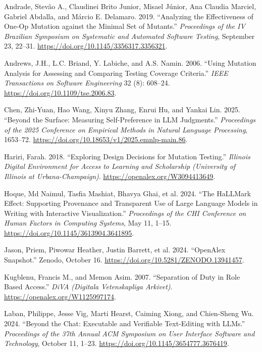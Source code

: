 \documentclass[
]{article}
\newlength{\cslhangindent}
\newenvironment{CSLReferences}[2] %
 {\begin{list}{}{%
  \setlength{\itemindent}{0pt}
  \setlength{\leftmargin}{0pt}
  \setlength{\parsep}{0pt}
  \ifodd #1
   \setlength{\leftmargin}{\cslhangindent}
   \setlength{\itemindent}{-1\cslhangindent}
  \fi
  \setlength{\itemsep}{#2\baselineskip}}}
 {\end{list}}
\begin{document}
\protect{}\label{refs}
\begin{CSLReferences}{1}{1}
Andrade, Stevão A., Claudinei Brito Junior, Misael Júnior, Ana Claudia
Marciel, Gabriel Abdalla, and Márcio E. Delamaro. 2019. {``Analyzing the
Effectiveness of One-Op Mutation against the Minimal Set of Mutants.''}
\emph{Proceedings of the IV Brazilian Symposium on Systematic and
Automated Software Testing}, September 23, 22--31.
\url{https://doi.org/10.1145/3356317.3356321}.

Andrews, J.H., L.C. Briand, Y. Labiche, and A.S. Namin. 2006. {``Using
Mutation Analysis for Assessing and Comparing Testing Coverage
Criteria.''} \emph{IEEE Transactions on Software Engineering} 32 (8):
608--24. \url{https://doi.org/10.1109/tse.2006.83}.

Chen, Zhi-Yuan, Hao Wang, Xinyu Zhang, Enrui Hu, and Yankai Lin. 2025.
{``Beyond the Surface: Measuring Self-Preference in LLM Judgments.''}
\emph{Proceedings of the 2025 Conference on Empirical Methods in Natural
Language Processing}, 1653--72.
\url{https://doi.org/10.18653/v1/2025.emnlp-main.86}.

Hariri, Farah. 2018. {``Exploring Design Decisions for Mutation
Testing.''} \emph{Illinois Digital Environment for Access to Learning
and Scholarship (University of Illinois at Urbana-Champaign)}.
\url{https://openalex.org/W3094413649}.

Hoque, Md Naimul, Tasfia Mashiat, Bhavya Ghai, et al. 2024. {``The
HaLLMark Effect: Supporting Provenance and Transparent Use of Large
Language Models in Writing with Interactive Visualization.''}
\emph{Proceedings of the CHI Conference on Human Factors in Computing
Systems}, May 11, 1--15. \url{https://doi.org/10.1145/3613904.3641895}.

Jason, Priem, Piwowar Heather, Justin Barrett, et al. 2024. {``OpenAlex
Snapshot.''} Zenodo, October 16.
\url{https://doi.org/10.5281/ZENODO.13941457}.

Kugblenu, Francis M., and Memon Asim. 2007. {``Separation of Duty in
Role Based Access.''} \emph{DiVA (Digitala Vetenskapliga Arkivet)}.
\url{https://openalex.org/W1125997174}.

Laban, Philippe, Jesse Vig, Marti Hearst, Caiming Xiong, and Chien-Sheng
Wu. 2024. {``Beyond the Chat: Executable and Verifiable Text-Editing
with LLMs.''} \emph{Proceedings of the 37th Annual ACM Symposium on User
Interface Software and Technology}, October 11, 1--23.
\url{https://doi.org/10.1145/3654777.3676419}.


\end{CSLReferences}
\end{document}
